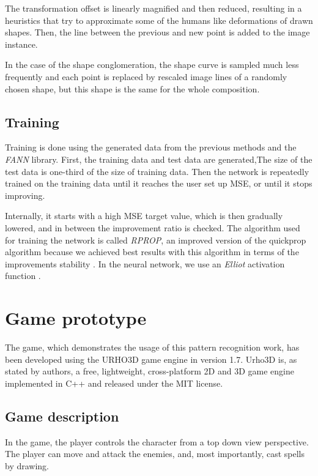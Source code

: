 The transformation  offset is linearly magnified and then reduced, resulting in a heuristics that try to approximate some of the humans like deformations of drawn shapes. Then, the line between the previous and new point is added to the image instance. 

In the case of the shape conglomeration, the shape curve is sampled much less frequently and each point is replaced by rescaled image lines of a randomly chosen shape, but this shape is the same for the whole composition. 

\subsection{Training}
Training is done using the generated data from the previous methods and the \emph{FANN} library. 
First, the training data and test data are generated,The size of the test data is one-third of the size of training data. Then the network is repeatedly trained on the training data until it reaches the user set up MSE, or until it stops improving.

Internally, it starts with a high MSE target value, which is then gradually lowered, and in between the improvement ratio is checked. The algorithm used for training the network is called \emph{RPROP},  an improved version of the quickprop algorithm because we achieved best results with this algorithm in terms of the improvements stability . In the neural network, we use an \emph{Elliot} activation function .

\section{Game prototype}
The game, which demonstrates the usage of this pattern recognition work, has been developed using the URHO3D game engine in version 1.7. Urho3D is, as stated by authors, a free, lightweight, cross-platform 2D and 3D game engine implemented in C++ and released under the MIT license.  

\subsection{Game description}
 In the game, the player controls the character from a top down view perspective. The player can move and attack the enemies, and, most importantly, cast spells by drawing. 


